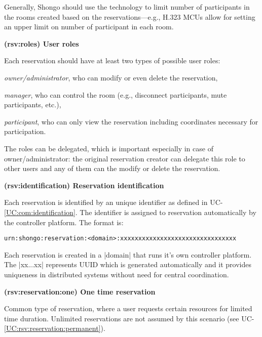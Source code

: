 \documentclass[a4paper]{report}
\makeatletter
\newcounter{UCcounter}
\newenvironment{UseCases}%
	{\begin{list}{\textbf{UC-\arabic{UCcounter}}}{\@nmbrlisttrue\def\@listctr{UCcounter}}}%
	{\end{list}}
\newcommand{\UClabel}[1]{\label{UC:#1}}
\newcommand{\UCref}[1]{UC-\ref{UC:#1}}
\newcommand{\UseCase}[2]{\item\UClabel{#2} \textbf{(#2) #1}\\ \nopagebreak}
\makeatother
\begin{document}
\begin{UseCases}
\begin{compactitem}
\end{compactitem}

Generally, Shongo should use the technology to limit number of participants in
the rooms created based on the reservations---e.g., H.323 MCUs allow for
setting an upper limit on number of participant in each room.

\UseCase{User roles}{rsv:roles}

Each reservation should have at least two types of possible user roles:

\begin{compactitem}

\item \emph{owner/administrator}, who can modify or even delete the reservation,

\item \emph{manager}, who can control the room (e.g., disconnect participants, mute participants, etc.),

\item \emph{participant}, who can only view the reservation including coordinates necessary for participation.

\end{compactitem}

The roles can be delegated, which is important especially in case of owner/administrator: the original reservation creator can delegate this role to other users and any of them can the modify or delete the reservation.


\UseCase{Reservation identification}{rsv:identification}

Each reservation is identified by an unique identifier as defined in \UCref{com:identification}. The identifier is assigned to reservation automatically by the controller platform. The format is:
\begin{verbatim}
urn:shongo:reservation:<domain>:xxxxxxxxxxxxxxxxxxxxxxxxxxxxxxxx
\end{verbatim}
Each reservation is created in a |domain| that runs it's own controller platform.
The |xx...xx| represents UUID \cite{rfc4122} which is generated automatically and it provides uniqueness in distributed systems without need for central coordination.


\UseCase{One time reservation}{rsv:reservation:one}

Common type of reservation, where a user requests certain resources for limited
time duration. Unlimited reservations are not assumed by this scenario (see
\UCref{rsv:reservation:permanent}).


\end{UseCases}
\end{document}
